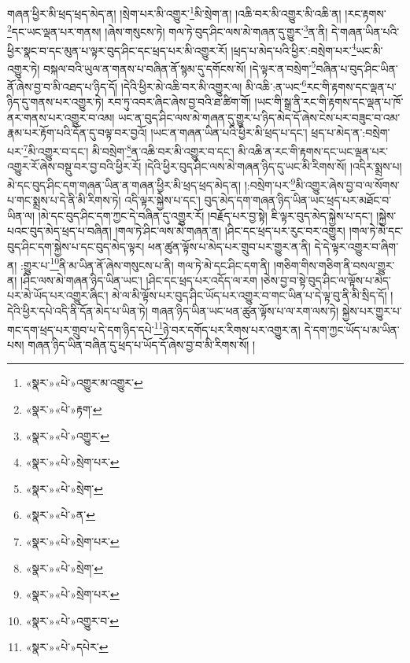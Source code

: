 གཞན་ཕྱིར་མི་ཕྲད་ཕྲད་མེད་ན། །སྲེག་པར་མི་འགྱུར་\footnote{«སྣར་»«པེ་»འགྱུར་མ་འགྱུར་}མི་སྲེག་ན། །འཆི་བར་མི་འགྱུར་མི་འཆི་ན། །རང་རྟགས་\footnote{«སྣར་»«པེ་»རྟག་}དང་ཡང་ལྡན་པར་གནས། །ཞེས་གསུངས་ཏེ། གལ་ཏེ་བུད་ཤིང་ལས་མེ་གཞན་དུ་གྱུར་\footnote{«སྣར་»«པེ་»འགྱུར་}ན་ནི། དེ་གཞན་ཡིན་པའི་ཕྱིར་སྣང་བ་དང་མུན་པ་ལྟར་བུད་ཤིང་དང་ཕྲད་པར་མི་འགྱུར་རོ། །ཕྲད་པ་མེད་པའི་ཕྱིར་:བསྲེག་པར་\footnote{«སྣར་»«པེ་»སྲེག་པར་}ཡང་མི་འགྱུར་ཏེ། བསྐལ་བའི་ཡུལ་ན་གནས་པ་བཞིན་ནོ་སྙམ་དུ་དགོངས་སོ། །དེ་ལྟར་ན་བསྲེག་\footnote{«སྣར་»«པེ་»སྲེག་}བཞིན་པ་བུད་ཤིང་ཡིན་ནོ་ཞེས་བྱ་བ་མི་འཐད་པ་ཉིད་དོ། །དེའི་ཕྱིར་མེ་འཆི་བར་མི་འགྱུར་ལ། མི་འཆི་:ན་ཡང་\footnote{«སྣར་»«པེ་»ན་}རང་གི་རྟགས་དང་ལྡན་པ་ཉིད་དུ་གནས་པར་འགྱུར་ཏེ། རབ་ཏུ་འབར་ཞིང་ཞེས་བྱ་བའི་ཐ་ཚིག་གོ། །ཡང་གི་སྒྲ་ནི་རང་གི་རྟགས་དང་ལྡན་པ་ཁོ་ནར་གནས་པར་འགྱུར་བ་འམ། ཡང་ན་བུད་ཤིང་ལས་མེ་གཞན་དུ་གྱུར་པ་ཉིད་མེད་དོ་ཞེས་ངེས་པར་བཟུང་བ་འམ་རྣམ་པར་རྟོག་པའི་དོན་དུ་བལྟ་བར་བྱའོ། །ཡང་ན་གཞན་ཡིན་པའི་ཕྱིར་མི་ཕྲད་པ་དང་། ཕྲད་པ་མེད་ན་:བསྲེག་པར་\footnote{«སྣར་»«པེ་»སྲེག་པར་}མི་འགྱུར་བ་དང་། མི་བསྲེག་\footnote{«སྣར་»«པེ་»སྲེག་}ན་འཆི་བར་མི་འགྱུར་བ་དང་། མི་འཆི་ན་རང་གི་རྟགས་དང་ཡང་ལྡན་པར་འགྱུར་རོ་ཞེས་བསྡུ་བར་བྱ་བའི་ཕྱིར་རོ། །དེའི་ཕྱིར་བུད་ཤིང་ལས་མེ་གཞན་ཉིད་དུ་ཡང་མི་རིགས་སོ། །འདིར་སྨྲས་པ། མེ་དང་བུད་ཤིང་དག་གཞན་ཡིན་ན་གཞན་ཕྱིར་མི་ཕྲད་ཕྲད་མེད་ན། །:བསྲེག་པར་\footnote{«སྣར་»«པེ་»སྲེག་པར་}མི་འགྱུར་ཞེས་བྱ་བ་ལ་སོགས་པ་གང་སྨྲས་པ་དེ་ནི་མི་རིགས་ཏེ། འདི་ལྟར་སྐྱེས་པ་དང་། བུད་མེད་དག་གཞན་ཉིད་ཡིན་ཡང་ཕྲད་པར་མཐོང་བ་ཡིན་ལ། །མེ་དང་བུད་ཤིང་དག་ཀྱང་དེ་བཞིན་དུ་འགྱུར་རོ། །བརྗོད་པར་བྱ་སྟེ། ཇི་ལྟར་བུད་མེད་སྐྱེས་པ་དང་། །སྐྱེས་པའང་བུད་མེད་ཕྲད་པ་བཞིན། །གལ་ཏེ་ཤིང་ལས་མེ་གཞན་ན། །ཤིང་དང་ཕྲད་པར་རུང་བར་འགྱུར། །གལ་ཏེ་མེ་དང་བུད་ཤིང་དག་སྐྱེས་པ་དང་བུད་མེད་ལྟར། ཕན་ཚུན་ལྟོས་པ་མེད་པར་གྲུབ་པར་གྱུར་ན་ནི། དེ་དེ་ལྟར་འགྱུར་བ་ཞིག་ན། :གྱུར་པ་\footnote{«སྣར་»«པེ་»འགྱུར་བ་}ནི་མ་ཡིན་ནོ་ཞེས་གསུངས་པ་ནི། གལ་ཏེ་མེ་དང་ཤིང་དག་ནི། །གཅིག་གིས་གཅིག་ནི་བསལ་གྱུར་ན། །ཤིང་ལས་མེ་གཞན་ཉིད་ཡིན་ཡང་། །ཤིང་དང་ཕྲད་པར་འདོད་ལ་རག །ཅེས་བྱ་བ་སྟེ་བུད་ཤིང་ལ་ལྟོས་པ་མེད་པར་མེ་ཡོད་པར་འགྱུར་ཞིང་། མེ་ལ་མི་ལྟོས་པར་བུད་ཤིང་ཡོད་པར་འགྱུར་བ་གང་ཡིན་པ་དེ་ལྟ་བུ་ནི་མི་སྲིད་དོ། །དེའི་ཕྱིར་དཔེ་འདི་ནི་དོན་མེད་པ་ཡིན་ཏེ། གཞན་ཉིད་ཡིན་ཡང་ཕན་ཚུན་ལྟོས་པ་ལ་རག་ལས་ཏེ། སྐྱེས་པར་གྱུར་པ་གང་དག་ཕྲད་པར་གྲུབ་པ་དེ་དག་ཉིད་དཔེ་\footnote{«སྣར་»«པེ་»དཔེར་}ཉེ་བར་དགོད་པར་རིགས་པར་འགྱུར་ན། དེ་དག་ཀྱང་ཡོད་པ་མ་ཡིན་པས། གཞན་ཉིད་ཡིན་བཞིན་དུ་ཕྲད་པ་ཡོད་དོ་ཞེས་བྱ་བ་མི་རིགས་སོ། །
